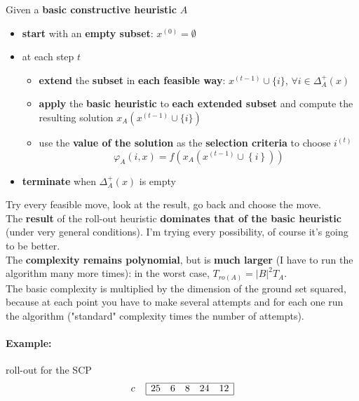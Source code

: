 Given a \textbf{basic constructive heuristic} $A$
\begin{itemize}
	\item \textbf{start} with an \textbf{empty subset}: $x^{(0)} = \emptyset$
	
	\item at each step $t$
	\begin{itemize}
		\item \textbf{extend} the \textbf{subset} in \textbf{each feasible way}: $x^{(t−1)} \cup \{i\}$, $\forall i \in \Delta_A^+ (x)$
		
		\item \textbf{apply} the \textbf{basic heuristic} to \textbf{each extended subset} and compute the resulting solution $x_A (x^{(t−1)} \cup \{i\})$
		
		\item use the \textbf{value of the solution} as the \textbf{selection criteria} to choose $i^(t)$
		$$ \varphi_A (i,x) = f \left(x_A \left(x^{(t-1)} \cup \left\{i\right\} \right) \right)$$
	\end{itemize}
	
	\item \textbf{terminate} when $\Delta_A^+ (x)$ is empty
\end{itemize}

Try every feasible move, look at the result, go back and choose the move. \\

The \textbf{result} of the roll-out heuristic \textbf{dominates that of the basic heuristic} (under very general conditions). I'm trying every possibility, of course it's going to be better.\\

The \textbf{complexity remains polynomial}, but is \textbf{much larger} (I have to run the algorithm many more times): in the worst case, $T_{ro(A)} = |B|^2 T_A$.\\

The basic complexity is multiplied by the dimension of the ground set squared, because at each point you have to make several attempts and for each one run the algorithm ("standard" complexity times the number of attempts).\\

\newpage

\paragraph{Example:} roll-out for the SCP
$$
c \;\;\;\;
\begin{array}{| c c c c c |}
	\hline
	25 & 6 & 8 & 24 & 12 \\
	\hline
\end{array}
$$

